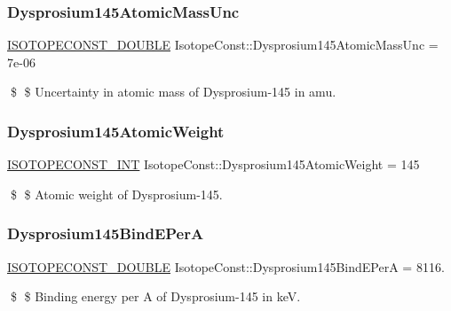 \subsubsection{\texorpdfstring{Dysprosium145\+Atomic\+Mass\+Unc}{Dysprosium145AtomicMassUnc}}
{\footnotesize\ttfamily \mbox{\hyperlink{group___isotope_const-_macros_ga8f45a7272ce02c0b4c65c44636ed719a}{I\+S\+O\+T\+O\+P\+E\+C\+O\+N\+S\+T\+\_\+\+D\+O\+U\+B\+LE}} Isotope\+Const\+::\+Dysprosium145\+Atomic\+Mass\+Unc = 7e-\/06}

\$ \$ Uncertainty in atomic mass of Dysprosium-\/145 in amu. \mbox{\label{group___isotope_const-_dysprosium-_dy145_gafa8be76ff3fc895c863071fe460fb34b}} 
\subsubsection{\texorpdfstring{Dysprosium145\+Atomic\+Weight}{Dysprosium145AtomicWeight}}
{\footnotesize\ttfamily \mbox{\hyperlink{group___isotope_const-_macros_ga5f18360b3e99483a35c32d789e62621c}{I\+S\+O\+T\+O\+P\+E\+C\+O\+N\+S\+T\+\_\+\+I\+NT}} Isotope\+Const\+::\+Dysprosium145\+Atomic\+Weight = 145}

\$ \$ Atomic weight of Dysprosium-\/145. \mbox{\label{group___isotope_const-_dysprosium-_dy145_gab99f72bac4df8c8c514ee3ce50171f7d}} 
\subsubsection{\texorpdfstring{Dysprosium145\+Bind\+E\+PerA}{Dysprosium145BindEPerA}}
{\footnotesize\ttfamily \mbox{\hyperlink{group___isotope_const-_macros_ga8f45a7272ce02c0b4c65c44636ed719a}{I\+S\+O\+T\+O\+P\+E\+C\+O\+N\+S\+T\+\_\+\+D\+O\+U\+B\+LE}} Isotope\+Const\+::\+Dysprosium145\+Bind\+E\+PerA = 8116.}

\$ \$ Binding energy per A of Dysprosium-\/145 in keV. \mbox{\label{group___isotope_const-_dysprosium-_dy145_gae3bcaf5d638eab637bc2cc0bcfc604c2}} 
